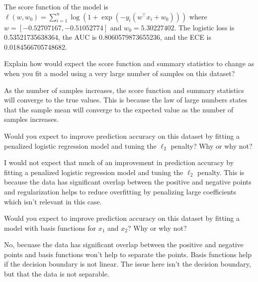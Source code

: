 \documentclass{article}
\begin{document}
\begin{probset}
\begin{prob}
\begin{subprobset}
\begin{subprob}
            \begin{soln}
                The score function of the model is $\ell(w, w_0) = \sum_{i=1}^n \log(1 + \exp(-y_i(w^\top x_i + w_0)))$ where $w = [-0.52707167, -0.51052774]$ and $w_0 = 5.30227402$. The logistic loss is 0.53521735638364, the AUC is 0.8060579873655236, and the ECE is 0.0184566705748682.
            \end{soln}
        \end{subprob}

        \begin{subprob}
            Explain how would expect the score function and summary statistics to change as when you fit a model using a very large number of samples on this dataset?

            \begin{soln}
                As the number of samples increases, the score function and summary statistics will converge to the true values. This is because the law of large numbers states that the sample mean will converge to the expected value as the number of samples increases.
            \end{soln}
        \end{subprob}

        \begin{subprob}
            Would you expect to improve prediction accuracy on this dataset by fitting a penalized logistic regression model and tuning the $\ell_2$ penalty? Why or why not?

            \begin{soln}
                I would not expect that much of an improvement in prediction accuracy by fitting a penalized logistic regression model and tuning the $\ell_2$ penalty. This is because the data has significant overlap between the positive and negative points and regularization helps to reduce overfitting by penalizing large coefficients which isn't relevant in this case.
            \end{soln}
        \end{subprob}

        \begin{subprob}
            Would you expect to improve prediction accuracy on this dataset by fitting a model with basis functions for $x_1$ and $x_2$? Why or why not?

            \begin{soln}
                No, becuase the data has significant overlap between the positive and negative points and basis functions won't help to separate the points. Basis functions help if the decision boundary is not linear. The issue here isn't the decision boundary, but that the data is not separable.
            \end{soln}
        \end{subprob}
    \end{subprobset}
\end{prob}


\end{probset}
\end{document}
